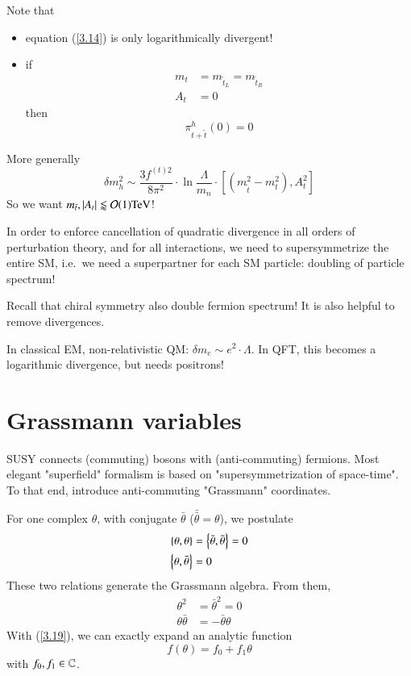 Note that 
\begin{itemize}
   \item equation (\ref{3.14}) is only logarithmically divergent!
   \item if 
      \begin{align}
         m_t &= m_{\tilde t_L} = m_{\tilde t_R} \label{3.15a}\\
         A_t &= 0 \label{3.15b}
      \end{align}
      then
      \begin{equation}
         \pi^h_{t + \tilde{t}}(0) =0 \label{3.16}
      \end{equation}
\end{itemize}
More generally
\begin{equation}
   \delta m_h^2 \sim \frac{3 f^{(t)2}}{8\pi^2} \cdot \ln \frac{\Lambda}{m_n} \cdot [(m^2_{\tilde t} - m^2_t), A^2_t] \label{3.17}
\end{equation}
So we want $m_{\tilde{t}}, |A_t| \lessapprox \order{1}\si{\tera \eV}$!

In order to enforce cancellation of quadratic divergence in all orders of perturbation theory, and for all interactions, we need to supersymmetrize the entire SM, i.e.~we need a superpartner for each SM particle: doubling of particle spectrum!

Recall that chiral symmetry also double fermion spectrum! It is also helpful to remove divergences.

In classical EM, non-relativistic QM: $\delta m_e \sim e^2 \cdot \Lambda$. In QFT, this becomes a logarithmic divergence, but needs positrons!

\section{Grassmann variables}
SUSY connects (commuting) bosons with (anti-commuting) fermions. Most elegant "superfield" formalism is based on "supersymmetrization of space-time". To that end, introduce anti-commuting "Grassmann" coordinates.

For one complex $\theta$, with conjugate $\bar{\theta}$ ($\bar{\bar{\theta}}=\theta$), we postulate
\begin{subequations}
   \label{3.18}
\begin{align}
   \acomm{\theta}{\theta} &= \acomm{\bar\theta}{\bar\theta} = 0 \label{3.18a}\\
   \acomm{\theta}{\bar\theta} &= 0 \label{3.18b}
\end{align}
\end{subequations}
These two relations generate the Grassmann algebra. From them,
\begin{subequations}
\label{3.19}
\begin{align}
   \theta^2 &= \bar{\theta}^2 = 0 \label{3.19a} \\
   \theta \bar\theta &= - \bar \theta \theta \label{3.19b}
\end{align}
\end{subequations}
With (\ref{3.19}), we can exactly expand an analytic function
\begin{equation}
   f(\theta) = f_0 + f_1 \theta \label{3.20}
\end{equation}
with $f_0, f_1 \in \mathbb{C}$.

